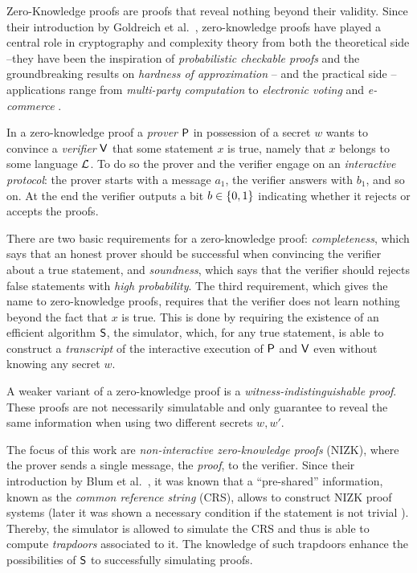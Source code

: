 Zero-Knowledge proofs are proofs that reveal nothing beyond their validity. Since their introduction by Goldreich et al.~\cite{GolMicRac89}, zero-knowledge proofs have played a central role in cryptography and complexity theory from both the theoretical side --they have been the inspiration of \emph{probabilistic checkable proofs} and the groundbreaking results on \emph{hardness of approximation} \cite{www:PCP}-- and the practical side -- applications range from \emph{multi-party computation} \cite{STOC:GolMicWig87}  to \emph{electronic voting} \cite{CREE:JueCarJak10} and \emph{e-commerce} \cite{EC:CamHohLys05}.

In a zero-knowledge proof a \emph{prover} $\mathsf{P}$ in possession of a secret $w$ wants to convince a \emph{verifier} $\mathsf{V}$ that some statement $x$ is true, namely that $x$ belongs to some language $\mathcal{L}$. To do so the prover and the verifier engage on an \emph{interactive protocol}: the prover starts with a message $a_1$, the verifier answers with $b_1$, and so on. At the end the verifier outputs a bit $b\in\{0,1\}$ indicating whether it rejects or accepts the proofs.

There are two basic requirements for a zero-knowledge proof: \emph{completeness}, which says that an honest prover should be successful when convincing the verifier about a true statement, and \emph{soundness}, which says that the verifier should rejects false statements with \emph{high probability}. The third requirement, which  gives the name to zero-knowledge proofs, requires that the verifier does not learn nothing beyond the fact that $x$ is true. This is done by requiring the existence of an efficient algorithm $\mathsf{S}$, the simulator, which, for any true statement, is able to construct a \emph{transcript} of the interactive execution of $\mathsf{P}$ and $\mathsf{V}$ even without knowing any secret $w$.

A weaker variant of a zero-knowledge proof is a \emph{witness-indistinguishable proof}. These proofs are not necessarily simulatable and only guarantee to reveal the same information when using two different secrets $w,w'$. 

The focus of this work are \emph{non-interactive  zero-knowledge proofs} (NIZK), where the prover sends a single message, the \emph{proof}, to the verifier. Since their introduction by Blum et al.~\cite{STOC:BluFelMic88}, it was known that a ``pre-shared'' information, known as the \emph{common reference string} (CRS), allows to construct NIZK proof systems (later it was shown a necessary condition if the statement is not trivial \cite{JC:GolOre94}). Thereby, the simulator is allowed to simulate the CRS and thus is able to compute \emph{trapdoors} associated to it. The knowledge of such trapdoors enhance the possibilities of $\mathsf{S}$ to successfully simulating proofs.

